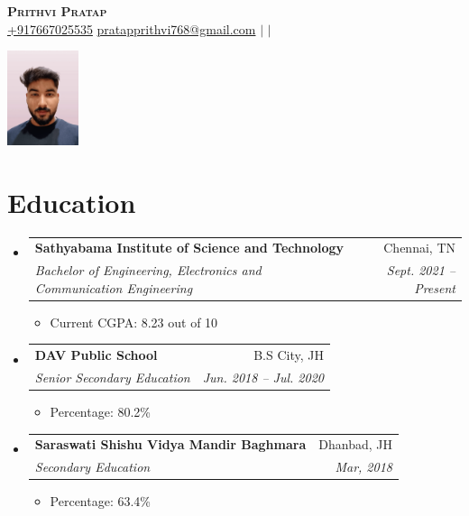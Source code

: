 \documentclass[letterpaper,11pt]{article}
\makeatletter
\newcommand{\resumeItem}[1]{
  \item\small{
    {#1 \vspace{-2pt}}
  }
}
\newcommand{\resumeSubheading}[4]{
  \vspace{-2pt}\item
    \begin{tabular*}{0.97\textwidth}[t]{l@{\extracolsep{\fill}}r}
      \textbf{#1} & #2 \\
      \textit{\small#3} & \textit{\small #4} \\
    \end{tabular*}\vspace{-7pt}
}
\newcommand{\resumeSubHeadingListStart}{\begin{itemize}[leftmargin=0.15in, label={}]}
\newcommand{\resumeSubHeadingListEnd}{\end{itemize}}
\newcommand{\resumeItemListStart}{\begin{itemize}}
\newcommand{\resumeItemListEnd}{\end{itemize}\vspace{-5pt}}
\makeatother
\begin{document}
\noindent
\begin{minipage}[t]{0.7\textwidth}
    \hfill %
    \begin{minipage}[t]{0.5\textwidth}
        \begin{center}
            \textbf{\Huge \scshape Prithvi Pratap} \\ \vspace{1pt}
            \small\href{tel:}{+917667025535} \href{mailto:pratapprithvi768@gmail.com}{pratapprithvi768@gmail.com} $|$ 
            \href{https://www.linkedin.com/in/prithvi-pratap-9a47b6221}{%
            } $|$
            \href{https://github.com/Prithvi-Pratap}{%
            }
        \end{center}
    \end{minipage}
\end{minipage}%
\begin{minipage}[t]{0.3\textwidth}
    \begin{flushright}
        \includegraphics[height=1.09in]{1000039122.png} %
    \end{flushright}
\end{minipage}





\section{Education}
\resumeSubHeadingListStart
    \resumeSubheading
      {Sathyabama Institute of Science and Technology}{Chennai, TN}
      {Bachelor of Engineering, Electronics and Communication Engineering}{Sept. 2021 -- Present}
      \resumeItemListStart
        \resumeItem{Current CGPA: 8.23 out of 10}
      \resumeItemListEnd
    \resumeSubheading
      {DAV Public School}{B.S City, JH}
      {Senior Secondary Education}{Jun. 2018 -- Jul. 2020}
      \resumeItemListStart
        \resumeItem{Percentage: 80.2\%}
      \resumeItemListEnd
       \resumeSubheading
      {Saraswati Shishu Vidya Mandir Baghmara}{Dhanbad, JH}
      {Secondary Education }{Mar, 2018}
      \resumeItemListStart
        \resumeItem{Percentage: 63.4\%}
      \resumeItemListEnd
\resumeSubHeadingListEnd
\end{document}
